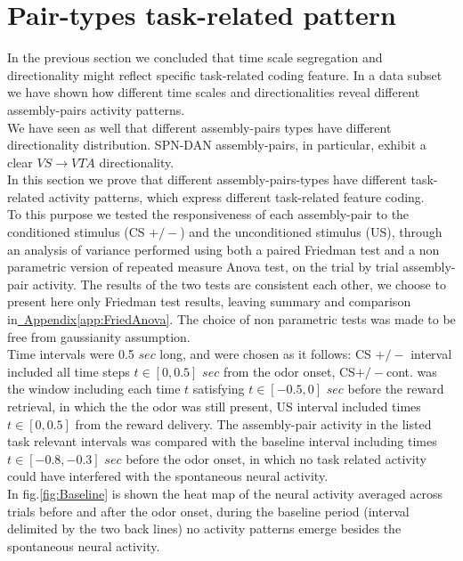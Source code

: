  \section{Pair-types task-related pattern}
 \label{sec:TaskResp}
In the previous section we concluded that time scale segregation and directionality might reflect specific task-related coding feature. In a data subset we have shown how different time scales and directionalities reveal different assembly-pairs activity patterns.\\We have seen as well that different assembly-pairs types have different directionality distribution. SPN-DAN assembly-pairs, in particular, exhibit a clear $VS\rightarrow VTA$ directionality.\\In this section we prove that different assembly-pairs-types have different task-related activity patterns, which express different task-related feature coding.\\
To this purpose we tested the responsiveness of each assembly-pair to the conditioned stimulus (CS $+/-$) and the unconditioned stimulus (US), through an analysis of variance performed using both a paired Friedman test and a non parametric version of repeated measure Anova test, on the trial by trial assembly-pair activity. The results of the two tests are consistent each other, we choose to present here only Friedman test results, leaving summary and comparison in\hyperref[app:FriedAnova]{~Appendix\ref*{app:FriedAnova}}. The choice of non parametric tests was made to be free from gaussianity assumption.\\Time intervals were 0.5 $sec$ long, and were chosen as it follows: CS $+/-$ interval included all time steps $t \in [0, 0.5]$ $sec$ from the odor onset, CS$+/-$cont. was the window including each time $t$ satisfying $t \in [-0.5, 0]$ $sec$ before the reward retrieval, in which the the odor was still present, US interval included times $t \in [0,0.5]$ from the reward delivery. The assembly-pair activity in the listed task relevant intervals was compared with the baseline interval including times $t \in [-0.8, -0.3]$ $sec$ before the odor onset, in which no task related activity could have interfered with the spontaneous neural activity.\\In fig.\ref{fig:Baseline} is shown the heat map of the neural activity averaged across trials before and after the odor onset, during the baseline period (interval delimited by the two back lines) no activity patterns emerge besides the spontaneous neural activity.\\
